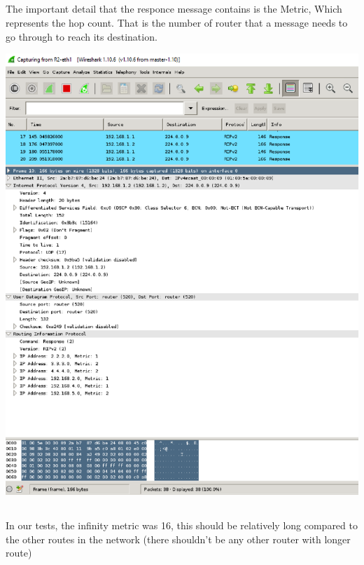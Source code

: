 \subsection{}
The important detail that the responce message contains is the Metric,
Which represents the hop count. That is the number of router that a message needs to go through
to reach its destination.
\begin{center}
    \includegraphics[width=1.2 \textwidth]{resources/mn2.png}\centering
\end{center}
\subsection{}
In our tests, the infinity metric was 16, this should be relatively long compared to the
other routes in the network (there shouldn't be any other router with longer route)

